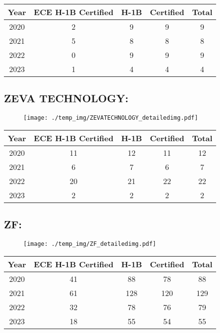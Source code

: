 \documentclass{article}%
\begin{document}
%
\begin{longtable}{c|c|c|c|c}%
\hline%
Year&ECE H{-}1B Certified&H{-}1B&Certified&Total\\%
\hline%
2020&2&9&9&9\\%
\hline%
2021&5&8&8&8\\%
\hline%
2022&0&9&9&9\\%
\hline%
2023&1&4&4&4\\%
\hline%
\end{longtable}

%
\newpage%
\subsection{ZEVA TECHNOLOGY:}%
\label{subsec:ZEVATECHNOLOGY}%
\label{ZEVATECHNOLOGYdetailed}%


\begin{figure}[htbp]%
\centering%
\texttt{[image: ./temp\_img/ZEVATECHNOLOGY\_detailedimg.pdf]}%
\end{figure}

%
\begin{longtable}{c|c|c|c|c}%
\hline%
Year&ECE H{-}1B Certified&H{-}1B&Certified&Total\\%
\hline%
2020&11&12&11&12\\%
\hline%
2021&6&7&6&7\\%
\hline%
2022&20&21&22&22\\%
\hline%
2023&2&2&2&2\\%
\hline%
\end{longtable}

%
\newpage%
\subsection{ZF:}%
\label{subsec:ZF}%
\label{ZFdetailed}%


\begin{figure}[htbp]%
\centering%
\texttt{[image: ./temp\_img/ZF\_detailedimg.pdf]}%
\end{figure}

%
\begin{longtable}{c|c|c|c|c}%
\hline%
Year&ECE H{-}1B Certified&H{-}1B&Certified&Total\\%
\hline%
2020&41&88&78&88\\%
\hline%
2021&61&128&120&129\\%
\hline%
2022&32&78&76&79\\%
\hline%
2023&18&55&54&55\\%
\hline%
\end{longtable}
\end{document}
